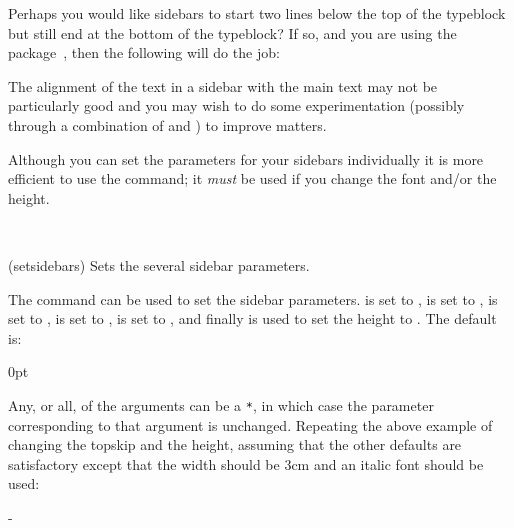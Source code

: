 \documentclass[10pt,a4paper,extrafontsizes]{memoir}
\newcommand{\LMnote}[2]{}
\begin{document}
    Perhaps you would like sidebars to start two lines below the top of
the typeblock but still end at the bottom of the typeblock? If so, and
you are using the  package~\cite{CALC}, then the following
will do the job:
\begin{lcode}
\setlength{\sidebartopskip}{2\onelineskip}
\setsidebarheight{\textheight-\sidebartopskip}
\end{lcode}


    The alignment of the text in a sidebar with the main text may not
be particularly good and you may wish to do some experimentation
(possibly through a combination of \lnc{\sidebarvsep} and 
\cmd{\setsidebarheight}) to improve matters.

    Although you can set the parameters for your sidebars individually it
is more efficient to use the \cmd{\setsidebars} command; it \emph{must} be 
used if you change the font and/or the height.
\begin{syntax}
\cmd{\setsidebars} \\
\end{syntax}
\glossary(setsidebars)%
  {}%
  {Sets the several sidebar parameters.}

The \cmd{\setsidebars} command can be used to set the sidebar parameters.
\lnc{\sidebarhsep} is set to , \lnc{\sidebarwidth} is set to
, \lnc{\sidebarvsep} is set to , \lnc{\sidebartopsep}
is set to , \cmd{\sidebarfont} is set to , 
and finally \cmd{\setsidebarheight} is used to set the height to .
The default is:
\LMnote{2010/02/07}{the default was wrong compared to the class}
\begin{lcode}
\setsidebars{\marginparsep}{\marginparwidth}{\onelineskip}%
            {0pt}{\normalsize\normalfont}{\textheight}
\end{lcode}
Any, or all, of the arguments can be a \verb?*?, in which case the parameter
corresponding to that argument is unchanged. Repeating the above example of 
changing the topskip and the height, assuming that the other defaults are 
satisfactory except that the width should be 3cm and an italic font should 
be used:
\begin{lcode}
\setsidebars{*}{3cm}{*}{2\onelineskip}{\itshape}%
            {\textheight-\sidebartopsep}
\end{lcode}
\end{document}

